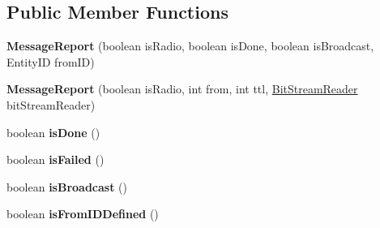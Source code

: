 \subsection*{Public Member Functions}
\begin{DoxyCompactItemize}
\item 
\hypertarget{classadf_1_1agent_1_1communication_1_1standard_1_1bundle_1_1topdown_1_1MessageReport_a9ade58ec0aa0cb99bd8c241964296896}{}\label{classadf_1_1agent_1_1communication_1_1standard_1_1bundle_1_1topdown_1_1MessageReport_a9ade58ec0aa0cb99bd8c241964296896} 
{\bfseries Message\+Report} (boolean is\+Radio, boolean is\+Done, boolean is\+Broadcast, Entity\+ID from\+ID)
\item 
\hypertarget{classadf_1_1agent_1_1communication_1_1standard_1_1bundle_1_1topdown_1_1MessageReport_aa6ad7e2e011615f7d97d928eb3335a90}{}\label{classadf_1_1agent_1_1communication_1_1standard_1_1bundle_1_1topdown_1_1MessageReport_aa6ad7e2e011615f7d97d928eb3335a90} 
{\bfseries Message\+Report} (boolean is\+Radio, int from, int ttl, \hyperlink{classadf_1_1component_1_1communication_1_1util_1_1BitStreamReader}{Bit\+Stream\+Reader} bit\+Stream\+Reader)
\item 
\hypertarget{classadf_1_1agent_1_1communication_1_1standard_1_1bundle_1_1topdown_1_1MessageReport_abe678c02ccff8051826035c3801e563f}{}\label{classadf_1_1agent_1_1communication_1_1standard_1_1bundle_1_1topdown_1_1MessageReport_abe678c02ccff8051826035c3801e563f} 
boolean {\bfseries is\+Done} ()
\item 
\hypertarget{classadf_1_1agent_1_1communication_1_1standard_1_1bundle_1_1topdown_1_1MessageReport_a39c887dcc705ac428e4c91319af1ad00}{}\label{classadf_1_1agent_1_1communication_1_1standard_1_1bundle_1_1topdown_1_1MessageReport_a39c887dcc705ac428e4c91319af1ad00} 
boolean {\bfseries is\+Failed} ()
\item 
\hypertarget{classadf_1_1agent_1_1communication_1_1standard_1_1bundle_1_1topdown_1_1MessageReport_a5984bbe2cb0e3332414a1550ae0eaa55}{}\label{classadf_1_1agent_1_1communication_1_1standard_1_1bundle_1_1topdown_1_1MessageReport_a5984bbe2cb0e3332414a1550ae0eaa55} 
boolean {\bfseries is\+Broadcast} ()
\item 
\hypertarget{classadf_1_1agent_1_1communication_1_1standard_1_1bundle_1_1topdown_1_1MessageReport_a3b89f0c5eb8838e91accd99c3baaf43b}{}\label{classadf_1_1agent_1_1communication_1_1standard_1_1bundle_1_1topdown_1_1MessageReport_a3b89f0c5eb8838e91accd99c3baaf43b} 
boolean {\bfseries is\+From\+I\+D\+Defined} ()
\item 

\end{DoxyCompactItemize}
